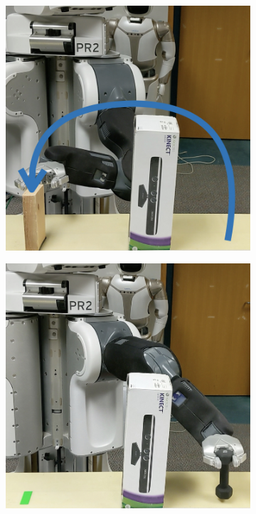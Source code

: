\begin{figure}[t]
\begin{subfigure}{0.24\linewidth}
  \end{subfigure}
  \begin{subfigure}{0.24\linewidth}
    \includegraphics[width=\linewidth]{figures/cmax/pr2_pick_place_light_3_annotated.jpeg}
  \end{subfigure}
  \begin{subfigure}{0.24\linewidth}
    \includegraphics[width=\linewidth]{figures/cmax/pr2_pick_place_heavy_1_annotated.jpeg}

\end{subfigure}
\end{figure}
